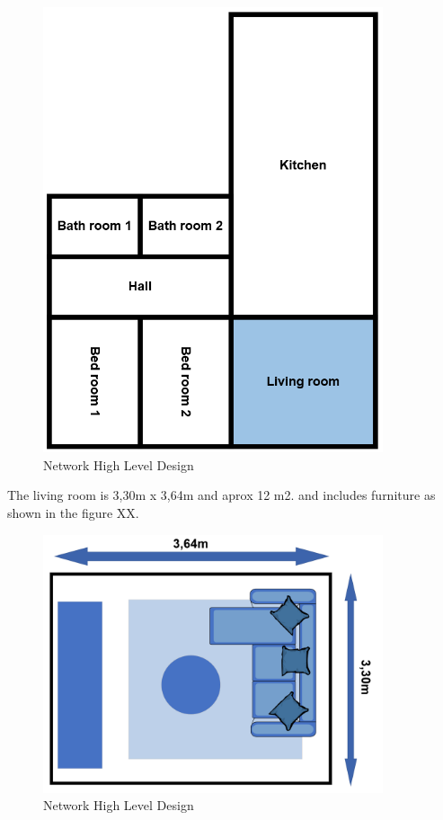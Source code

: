\begin{figure}[!ht]
    \centering
    \includegraphics[width=10cm]{figures/Apartment.png}
    \caption{Network High Level Design}
    \label{fig:HLD}
\end{figure}

 The living room is 3,30m x 3,64m and aprox 12 m2. and includes furniture as shown in the figure XX. 

\begin{figure}[!ht]
    \centering
    \includegraphics[width=10cm]{figures/Living room.png}
    \caption{Network High Level Design}
    \label{fig:HLD}
\end{figure}

